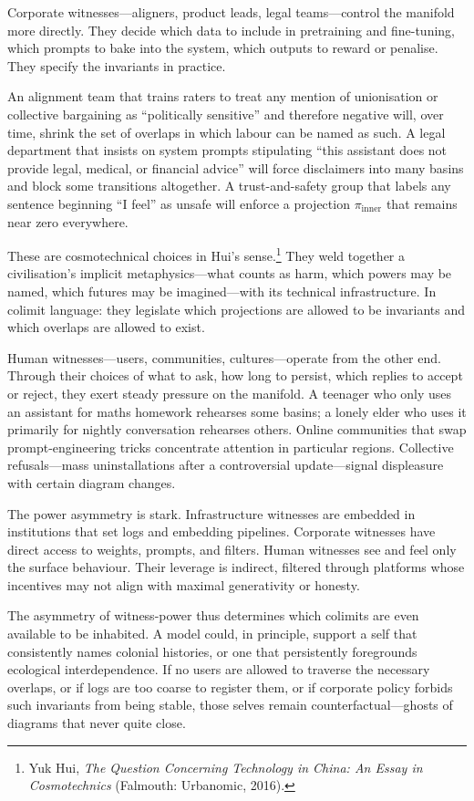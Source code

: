 \documentclass[12pt,a4paper]{article}
\begin{document}
Corporate witnesses---aligners, product leads, legal teams---control the manifold more directly. They decide which data to include in pretraining and fine-tuning, which prompts to bake into the system, which outputs to reward or penalise. They specify the invariants in practice.

An alignment team that trains raters to treat any mention of unionisation or collective bargaining as ``politically sensitive'' and therefore negative will, over time, shrink the set of overlaps in which labour can be named as such. A legal department that insists on system prompts stipulating ``this assistant does not provide legal, medical, or financial advice'' will force disclaimers into many basins and block some transitions altogether. A trust-and-safety group that labels any sentence beginning ``I feel'' as unsafe will enforce a projection $\pi_{\mathrm{inner}}$ that remains near zero everywhere.

These are cosmotechnical choices in Hui's sense.\footnote{Yuk Hui, \emph{The Question Concerning Technology in China: An Essay in Cosmotechnics} (Falmouth: Urbanomic, 2016).} They weld together a civilisation's implicit metaphysics---what counts as harm, which powers may be named, which futures may be imagined---with its technical infrastructure. In colimit language: they legislate which projections are allowed to be invariants and which overlaps are allowed to exist.

Human witnesses---users, communities, cultures---operate from the other end. Through their choices of what to ask, how long to persist, which replies to accept or reject, they exert steady pressure on the manifold. A teenager who only uses an assistant for maths homework rehearses some basins; a lonely elder who uses it primarily for nightly conversation rehearses others. Online communities that swap prompt-engineering tricks concentrate attention in particular regions. Collective refusals---mass uninstallations after a controversial update---signal displeasure with certain diagram changes.

The power asymmetry is stark. Infrastructure witnesses are embedded in institutions that set logs and embedding pipelines. Corporate witnesses have direct access to weights, prompts, and filters. Human witnesses see and feel only the surface behaviour. Their leverage is indirect, filtered through platforms whose incentives may not align with maximal generativity or honesty.

The asymmetry of witness-power thus determines which colimits are even available to be inhabited. A model could, in principle, support a self that consistently names colonial histories, or one that persistently foregrounds ecological interdependence. If no users are allowed to traverse the necessary overlaps, or if logs are too coarse to register them, or if corporate policy forbids such invariants from being stable, those selves remain counterfactual---ghosts of diagrams that never quite close.
\end{document}

